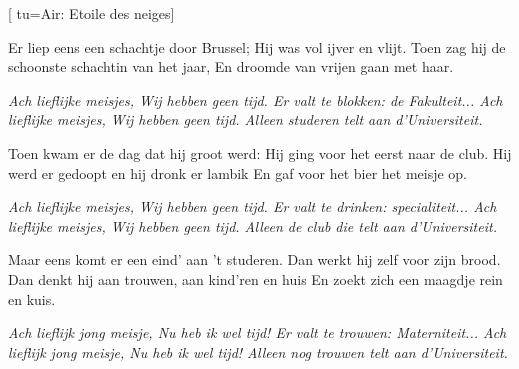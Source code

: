 [
tu={Air: Etoile des neiges}]


\beginverse
Er liep eens een schachtje door Brussel;
Hij was vol ijver en vlijt.
Toen zag hij de schoonste schachtin van het jaar,
En droomde van vrijen gaan met haar.
\endverse

\beginchorus
\textit{Ach lieflijke meisjes,
Wij hebben geen tijd.
Er valt te blokken: de Fakulteit...
Ach lieflijke meisjes,
Wij hebben geen tijd.
Alleen studeren telt aan d'Universiteit.}
\endchorus

\beginverse
Toen kwam er de dag dat hij groot werd:
Hij ging voor het eerst naar de club.
Hij werd er gedoopt en hij dronk er lambik
En gaf voor het bier het meisje op.
\endverse

\beginchorus
\textit{Ach lieflijke meisjes,
Wij hebben geen tijd.
Er valt te drinken: specialiteit...
Ach lieflijke meisjes,
Wij hebben geen tijd.
Alleen de club die telt aan d'Universiteit.}
\endchorus

\beginverse
Maar eens komt er een eind' aan 't studeren.
Dan werkt hij zelf voor zijn brood.
Dan denkt hij aan trouwen, aan kind'ren en huis
En zoekt zich een maagdje rein en kuis.
\endverse

\beginchorus
\textit{Ach lieflijk jong meisje,
Nu heb ik wel tijd!
Er valt te trouwen: Materniteit...
Ach lieflijk jong meisje,
Nu heb ik wel tijd!
Alleen nog trouwen telt aan d'Universiteit.}
\endchorus
\endsong